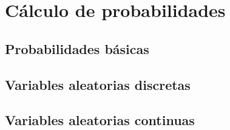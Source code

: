 \part{Cálculo de probabilidades}
\chapter{Probabilidades básicas}
\chapter{Variables aleatorias discretas}
\chapter{Variables aleatorias continuas}
